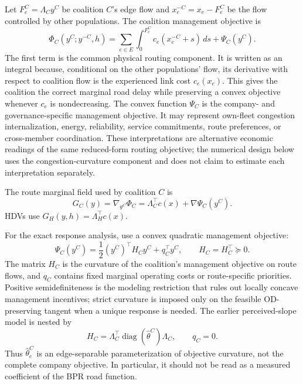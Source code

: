 Let $F_e^C=\Lambda_Cy^C$ be coalition $C$'s edge flow and $x_e^{-C}=x_e-F_e^C$ be the flow controlled by other populations. The coalition management objective is
\begin{equation}\label{eq:coalition-objective}
 \Phi_C(y^C;y^{-C},h)
 =\sum_{e\in E}\int_0^{F_e^C}c_e(x_e^{-C}+s)\,ds
 +\Psi_C(y^C).
\end{equation}
The first term is the common physical routing component. It is written as an integral because, conditional on the other populations' flow, its derivative with respect to coalition flow is the experienced link cost $c_e(x_e)$. This gives the coalition the correct marginal road delay while preserving a convex objective whenever $c_e$ is nondecreasing. The convex function $\Psi_C$ is the company- and governance-specific management objective. It may represent own-fleet congestion internalization, energy, reliability, service commitments, route preferences, or cross-member coordination. These interpretations are alternative economic readings of the same reduced-form routing objective; the numerical design below uses the congestion-curvature component and does not claim to estimate each interpretation separately.

The route marginal field used by coalition $C$ is
\begin{equation}\label{eq:coalition-gradient}
 G_C(y)=\nabla_{y^C}\Phi_C
 =\Lambda_C^\top c(x)+\nabla\Psi_C(y^C).
\end{equation}
HDVs use $G_H(y,h)=\Lambda_H^\top c(x)$.

For the exact response analysis, use a convex quadratic management objective:
\begin{equation}\label{eq:quadratic-objective}
 \Psi_C(y^C)=\frac12(y^C)^\top H_Cy^C+q_C^\top y^C,
 \qquad H_C=H_C^\top\succeq0.
\end{equation}
The matrix $H_C$ is the curvature of the coalition's management objective on route flows, and $q_C$ contains fixed marginal operating costs or route-specific priorities. Positive semidefiniteness is the modeling restriction that rules out locally concave management incentives; strict curvature is imposed only on the feasible OD-preserving tangent when a unique response is needed. The earlier perceived-slope model is nested by
\begin{equation}\label{eq:slope-nested}
 H_C=\Lambda_C^\top\operatorname{diag}(\widehat\theta^C)\Lambda_C,\qquad q_C=0.
\end{equation}
Thus $\widehat\theta_e^C$ is an edge-separable parameterization of objective curvature, not the complete company objective. In particular, it should not be read as a measured coefficient of the BPR road function.

